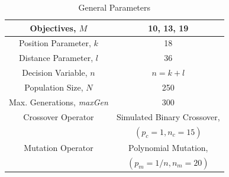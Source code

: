 \documentclass[journal]{IEEEtran}
\begin{document}

\begin{center}
\begin{table}[!thb]
\caption{General Parameters}
\begin{tabular}{| c | c |}
\hline

Objectives, $M$ & 10, 13, 19\\
\hline

Position Parameter, $k$ & 18\\
\hline

Distance Parameter, $l$ & 36\\
\hline


Decision Variable, $n$ & $n = k+l$\\
\hline


Population Size, $N$ & 250\\
\hline


Max. Generations, \textit{maxGen} & 300\\
\hline

Crossover Operator & Simulated Binary Crossover,\\& $(p_c=1,n_c=15)$\\
\hline

Mutation Operator & Polynomial Mutation,\\& $(p_m=1/n,n_m=20)$\\
\hline

\end{tabular}
\label{tab:settings}
\end{table}
\end{center}
\end{document}
